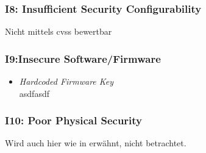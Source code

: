         \subsubsection*{I8: Insufficient Security Configurability}
            Nicht mittels \gls{cvss} bewertbar
            
        \subsubsection*{I9:Insecure Software/Firmware}
            \begin{itemize}[leftmargin=0cm,label={}]
    	        \item \emph{Hardcoded Firmware Key}\label{vuln:prototype_firmwarekey}\\
                    asdfasdf
            \end{itemize}
            
        \subsubsection*{I10: Poor Physical Security}
            Wird auch hier wie in  erwähnt, nicht betrachtet.
    
    
